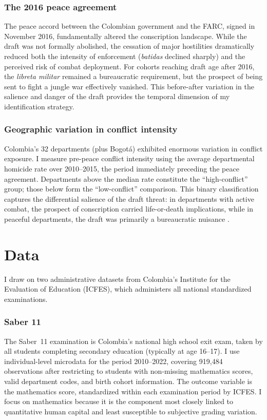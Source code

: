 \documentclass[12pt]{article}
\begin{document}
\subsubsection*{The 2016 peace agreement} The peace accord between the Colombian government and the FARC, signed in November 2016, fundamentally altered the conscription landscape. While the draft was not formally abolished, the cessation of major hostilities dramatically reduced both the intensity of enforcement (\textit{batidas} declined sharply) and the perceived risk of combat deployment. For cohorts reaching draft age after 2016, the \textit{libreta militar} remained a bureaucratic requirement, but the prospect of being sent to fight a jungle war effectively vanished. This before-after variation in the salience and danger of the draft provides the temporal dimension of my identification strategy.

\subsubsection*{Geographic variation in conflict intensity} Colombia's 32 departments (plus Bogot\'{a}) exhibited enormous variation in conflict exposure. I measure pre-peace conflict intensity using the average departmental homicide rate over 2010--2015, the period immediately preceding the peace agreement. Departments above the median rate constitute the ``high-conflict'' group; those below form the ``low-conflict'' comparison. This binary classification captures the differential salience of the draft threat: in departments with active combat, the prospect of conscription carried life-or-death implications, while in peaceful departments, the draft was primarily a bureaucratic nuisance \citep{camacho2008}.


\section{Data}

I draw on two administrative datasets from Colombia's Institute for the Evaluation of Education (ICFES), which administers all national standardized examinations.

\subsubsection*{Saber 11} The Saber~11 examination is Colombia's national high school exit exam, taken by all students completing secondary education (typically at age 16--17). I use individual-level microdata for the period 2010--2022, covering 919,484 observations after restricting to students with non-missing mathematics scores, valid department codes, and birth cohort information. The outcome variable is the mathematics score, standardized within each examination period by ICFES. I focus on mathematics because it is the component most closely linked to quantitative human capital and least susceptible to subjective grading variation.
\end{document}

